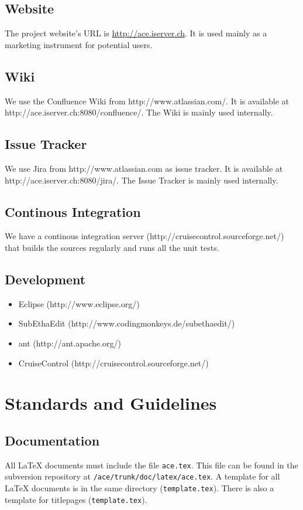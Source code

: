 \documentclass[11pt,a4paper]{article}
\begin{document}
\subsection{Website}
The project website's URL is \href{http://ace.iserver.ch}{http://ace.iserver.ch}. It is used mainly as a marketing instrument
for potential users. 

\subsection{Wiki}
We use the Confluence Wiki from http://www.atlassian.com/. It is available
at http://ace.iserver.ch:8080/confluence/. The Wiki is mainly used internally.

\subsection{Issue Tracker}
We use Jira from http://www.atlassian.com as issue tracker. It is available
at http://ace.iserver.ch:8080/jira/. The Issue Tracker is mainly used internally.

\subsection{Continous Integration}
We have a continous integration server (http://cruisecontrol.sourceforge.net/) that builds the
sources regularly and runs all the unit tests.

\subsection{Development}
\begin{itemize}
 \item Eclipse (http://www.eclipse.org/)
 \item SubEthaEdit (http://www.codingmonkeys.de/subethaedit/)
 \item ant (http://ant.apache.org/)
 \item CruiseControl (http://cruisecontrol.sourceforge.net/)
\end{itemize}


\section{Standards and Guidelines}

\subsection{Documentation}
All \LaTeX{} documents must include the file \texttt{ace.tex}. This file can be found in the subversion repository at \texttt{/ace/trunk/doc/latex/ace.tex}.
A template for all \LaTeX{} documents is in the same directory (\texttt{template.tex}). There is also a template for titlepages (\texttt{template.tex}).
\end{document}
